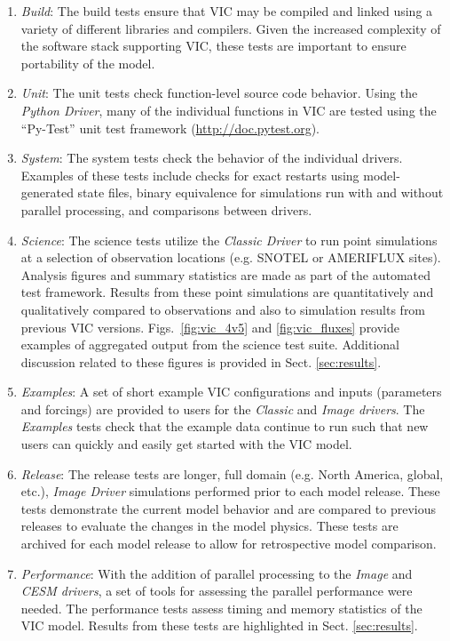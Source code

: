 \documentclass[gmd, manuscript]{copernicus}
\begin{document}
    \begin{enumerate}
      \item \textit{Build}: The build tests ensure that VIC may be compiled and linked using a variety of different libraries and compilers. Given the increased complexity of the software stack supporting VIC, these tests are important to ensure portability of the model.

      \item \textit{Unit}: The unit tests check function-level source code behavior. Using the \textit{Python Driver}, many of the individual functions in VIC are tested using the ``Py-Test'' unit test framework (\url{http://doc.pytest.org}).

      \item \textit{System}: The system tests check the behavior of the individual drivers. Examples of these tests include checks for exact restarts using model-generated state files, binary equivalence for simulations run with and without parallel processing, and comparisons between drivers.

      \item \textit{Science}: The science tests utilize the \textit{Classic Driver} to run point simulations at a selection of observation locations (e.g. SNOTEL or AMERIFLUX sites). Analysis figures and summary statistics are made as part of the automated test framework. Results from these point simulations are quantitatively and qualitatively compared to observations and also to simulation results from previous VIC versions. Figs.~\ref{fig:vic_4v5} and \ref{fig:vic_fluxes} provide examples of aggregated output from the science test suite. Additional discussion related to these figures is provided in Sect. \ref{sec:results}.

      \item \textit{Examples}: A set of short example VIC configurations and inputs (parameters and forcings) are provided to users for the \textit{Classic} and \textit{Image drivers}. The \textit{Examples} tests check that the example data continue to run such that new users can quickly and easily get started with the VIC model.

      \item \textit{Release}: The release tests are longer, full domain (e.g. North America, global, etc.), \textit{Image Driver} simulations performed prior to each model release. These tests demonstrate the current model behavior and are compared to previous releases to evaluate the changes in the model physics. These tests are archived for each model release to allow for retrospective model comparison.

      \item \textit{Performance}: With the addition of parallel processing to the \textit{Image} and \textit{CESM drivers}, a set of tools for assessing the parallel performance were needed. The performance tests assess timing and memory statistics of the VIC model. Results from these tests are highlighted in Sect. \ref{sec:results}.
    \end{enumerate}
\end{document}
